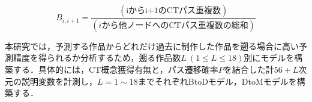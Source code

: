 \documentclass[submit]{ipsj}
\begin{document}
\begin{equation}\label{formula:single-ct-path}
  B_{i,i+1} = \frac{(\mbox{iからi+1のCTパス重複数})}{(i\mbox{から他ノードへのCTパス重複数の総和})} 
\end{equation}





本研究では，予測する作品からどれだけ過去に制作した作品を遡る場合に高い予測精度を得られるか分析するため，遡る作品数$L~(1 \leq L \leq 18)$別にモデルを構築する．具体的には，CT概念獲得有無と，パス遷移確率$P$を結合した計$56+L$次元の説明変数を計測し，$L=1\sim18$までそれぞれBtoDモデル，DtoMモデルを構築する．

\end{document}
